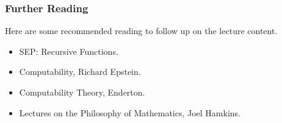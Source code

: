 \documentclass{beamer}
\theoremstyle{indentDefn} \newtheorem{defn}[]{Definition}
\begin{document}
\begin{frame}
	\frametitle{Further Reading}
	
	Here are some recommended reading to follow up on the lecture content.
	
	\vspace{0.5cm}
	
	\begin{itemize}
		\item SEP: Recursive Functions. 
		\item Computability, Richard Epstein. 
		\item Computability Theory, Enderton.
		\item Lectures on the Philosophy of Mathematics, Joel Hamkins.		
	\end{itemize}
	
\end{frame}
\end{document}
